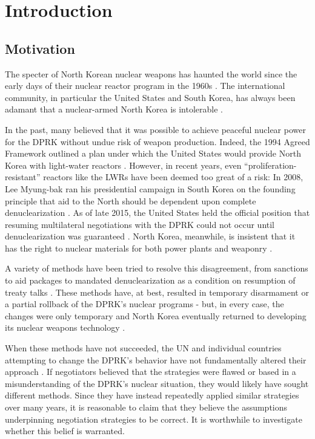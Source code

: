 \chapter*{Introduction}

\section*{Motivation}

The specter of North Korean nuclear weapons has haunted the world since the early days of their nuclear reactor program in the 1960s \cite{pincus}. The international community, in particular the United States and South Korea, has always been adamant that a nuclear-armed North Korea is intolerable \cite{kerry,parksk}.

In the past, many believed that it was possible to achieve peaceful nuclear power for the DPRK without undue risk of weapon production. Indeed, the 1994 Agreed Framework outlined a plan under which the United States would provide North Korea with light-water reactors \cite{agreed}. However, in recent years, even ``proliferation-resistant'' reactors like the LWRs have been deemed too great of a risk: In 2008, Lee Myung-bak ran his presidential campaign in South Korea on the founding principle that aid to the North should be dependent upon complete denuclearization \cite{snyder}. As of late 2015, the United States held the official position that resuming multilateral negotiations with the DPRK could not occur until denuclearization was guaranteed \cite{pennington}. North Korea, meanwhile, is insistent that it has the right to nuclear materials for both power plants and weaponry \cite{kcna}. 

A variety of methods have been tried to resolve this disagreement, from sanctions to aid packages to mandated denuclearization as a condition on resumption of treaty talks \cite{bajoria,davenport}. These methods have, at best, resulted in temporary disarmament or a partial rollback of the DPRK's nuclear programs - but, in every case, the changes were only temporary and North Korea eventually returned to developing its nuclear weapons technology \cite{davenport,nti15,iaea09}.

When these methods have not succeeded, the UN and individual countries attempting to change the DPRK's behavior have not fundamentally altered their approach \cite{davenport,nti15}. If negotiators believed that the strategies were flawed or based in a misunderstanding of the DPRK's nuclear situation, they would likely have sought different methods. Since they have instead repeatedly applied similar strategies over many years, it is reasonable to claim that they believe the assumptions underpinning negotiation strategies to be correct. It is worthwhile to investigate whether this belief is warranted.

